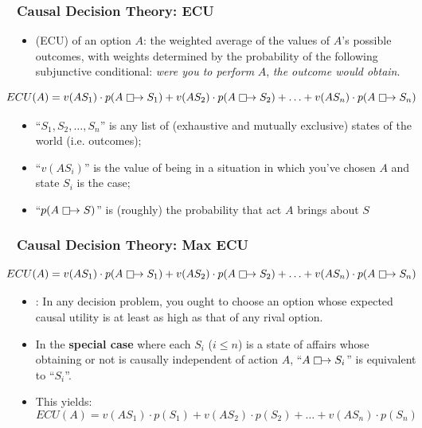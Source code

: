 \begin{frame}
\frametitle{Causal Decision Theory: ECU}

\begin{itemize}[<+->]

\item {} (ECU) of an option $A$: the weighted average of the values of $A$'s possible outcomes, with weights determined by the probability of the following subjunctive conditional: \textit{were you to perform} $A$, \textit{the outcome would obtain}. 
\end{itemize}
\pause 
\[
\hspace{-1em} ECU(A) = v(A S_1) \cdot p(A \mathrel{\mathop\Box}\mathrel{\mkern-2.5mu}\rightarrow S_1) +  v(A S_2) \cdot p(A \mathrel{\mathop\Box}\mathrel{\mkern-2.5mu}\rightarrow S_2) + \ldots +  v(A S_n) \cdot p(A \mathrel{\mathop\Box}\mathrel{\mkern-2.5mu}\rightarrow S_n)
\]

\begin{itemize}[<+->]

\item ``$S_1, S_2,\ldots, S_n$'' is any list of (exhaustive and mutually exclusive) states of the world (i.e. outcomes);

\item ``$v(A S_i)$'' is the value of being in a situation in which you've chosen $A$ and state $S_i$ is the case;

\item ``$p(A \mathrel{\mathop\Box}\mathrel{\mkern-2.5mu}\rightarrow S)$'' is (roughly) the probability that act $A$ brings about $S$\label{gloss:cond-prob6}


\end{itemize}
\end{frame}

\begin{frame}
\frametitle{Causal Decision Theory: Max ECU}

\[
\hspace{-1em} ECU(A) = v(A S_1) \cdot p(A \mathrel{\mathop\Box}\mathrel{\mkern-2.5mu}\rightarrow S_1) +  v(A S_2) \cdot p(A \mathrel{\mathop\Box}\mathrel{\mkern-2.5mu}\rightarrow S_2) + \ldots +  v(A S_n) \cdot p(A \mathrel{\mathop\Box}\mathrel{\mkern-2.5mu}\rightarrow S_n)
\]

\begin{itemize}[<+->]

\item {}: In any decision problem, you ought to choose an option whose expected causal utility is at least as high as that of any rival option. 

\item In the \textbf{special case} where each $S_i$ ($i \leq n$) is a state of affairs whose obtaining or not is causally independent of action $A$, ``$A \mathrel{\mathop\Box}\mathrel{\mkern-2.5mu}\rightarrow S_i$'' is equivalent to ``$S_i$''. 

\item[] This yields:
\[
ECU(A) = v(A S_1) \cdot p(S_1) +  v(A S_2) \cdot p(S_2) + \ldots +  v(A S_n) \cdot p(S_n)
\]

\end{itemize}

\end{frame}

